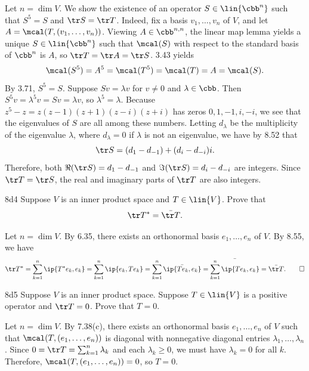 \begin{sol}
    Let $n = \dim V$.
    We show the existence of an operator $S \in \lin{\cbb^n}$ such that $S^5 = S$ and $\tr S = \tr T$.
    Indeed, fix a basis $v_1, \ldots, v_n$ of $V$, and let $A = \mcal(T, (v_1, \ldots, v_n))$.
    Viewing $A \in \cbb^{n, n}$, the linear map lemma yields a unique $S \in \lin{\cbb^n}$ such that $\mcal(S)$ with respect to the standard basis of $\cbb^n$ is $A$, so $\tr T = \tr A = \tr S$.
    3.43 yields
    \[
        \mcal(S^5) = A^5 = \mcal(T^5) = \mcal(T) = A = \mcal(S).
    \]
    By 3.71, $S^5 = S$.
    Suppose $S v = \lambda v$ for $v \neq 0$ and $\lambda \in \cbb$.
    Then $S^5 v = \lambda^5 v = S v = \lambda v$, so $\lambda^5 = \lambda$.
    Because $z^5 - z = z(z-1)(z+1)(z-i)(z+i)$ has zeros $0, 1, -1, i, -i$, we see that the eigenvalues of $S$ are all among these numbers.
    Letting $d_\lambda$ be the multiplicity of the eigenvalue $\lambda$, where $d_\lambda = 0$ if $\lambda$ is not an eigenvalue, we have by 8.52 that
    \[
        \tr S = (d_1 - d_{-1}) + (d_i - d_{-i})i.
    \]
    Therefore, both $\Re(\tr S) = d_1 - d_{-1}$ and $\Im(\tr S) = d_i - d_{-i}$ are integers.
    Since $\tr T = \tr S$, the real and imaginary parts of $\tr T$ are also integers.
\end{sol}

\begin{exercise}{8d4}
    Suppose $V$ is an inner product space and $T \in \lin{V}$.
    Prove that
    \[
        \tr T^\ast = \bar{\tr T}.
    \]
\end{exercise}

\begin{sol}
    Let $n = \dim V$.
    By 6.35, there exists an orthonormal basis $e_1, \ldots, e_n$ of $V$.
    By 8.55, we have
    \[
        \tr T^\ast = \sum_{k=1}^n \ip{T^\ast e_k, e_k} = \sum_{k=1}^n \ip{e_k, T e_k} = \sum_{k=1}^n \bar{\ip{T e_k, e_k}} = \bar{\sum_{k=1}^n \ip{T e_k, e_k}} = \bar{\tr T}. \qedhere
    \]
\end{sol}

\begin{exercise}{8d5}
    Suppose $V$ is an inner product space.
    Suppose $T \in \lin{V}$ is a positive operator and $\tr T = 0$.
    Prove that $T = 0$.
\end{exercise}

\begin{sol}
    Let $n = \dim V$.
    By 7.38(c), there exists an orthonormal basis $e_1, \ldots, e_n$ of $V$ such that $\mcal(T, (e_1, \ldots, e_n))$ is diagonal with nonnegative diagonal entries $\lambda_1, \ldots, \lambda_n$.
    Since $0 = \tr T = \sum_{k=1}^{n} \lambda_k$ and each $\lambda_k \geq 0$, we must have $\lambda_k = 0$ for all $k$.
    Therefore, $\mcal(T, (e_1, \ldots, e_n)) = 0$, so $T = 0$.
\end{sol}

